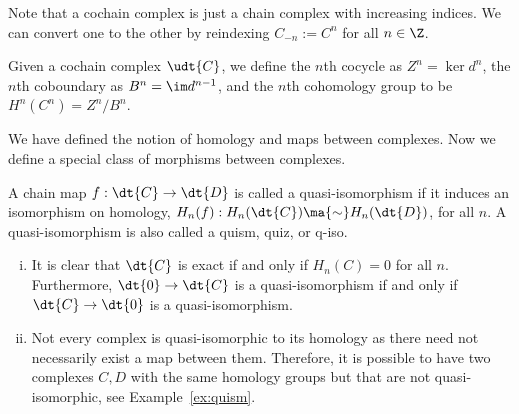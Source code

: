 Note that a cochain complex is just a chain complex with increasing indices. We can convert one to the other by reindexing $C_{-n}:= C^n$ for all $n \in \Z$. 


\begin{dfn}
Given a cochain complex $\udt{C}$, we define the $n$th cocycle as $Z^n=\ker d^n$, the $n$th coboundary  as $B^n=\im d^{n-1}$, and the $n$th cohomology group to be $H^n(C^n)=Z^n/B^n$. 
\end{dfn}


We have defined the notion of homology and maps between complexes. Now we define a special class of morphisms between complexes. 


\begin{dfn}
A chain map $f: \dt{C} \rightarrow \dt{D}$ is called a quasi-isomorphism if it induces an isomorphism on homology, $H_n(f): H_n(\dt{C}) \ma{\sim} H_n(\dt{D})$, for all $n$. A quasi-isomorphism is also called a quism, quiz, or q-iso. 
\end{dfn}


\begin{rem} \hfill
	\begin{enumerate}[(i)]
	\item It is clear that $\dt{C}$ is exact if and only if $H_n(C)=0$ for all $n$. Furthermore, $\dt{0} \rightarrow \dt{C}$ is a quasi-isomorphism if and only if $\dt{C} \rightarrow \dt{0}$ is a quasi-isomorphism. 
	\item Not every complex is quasi-isomorphic to its homology as there need not necessarily exist a map between them. Therefore, it is possible to have two complexes $C,D$ with the same homology groups but that are not quasi-isomorphic, see Example~\ref{ex:quism}.
	\end{enumerate}
\end{rem}


